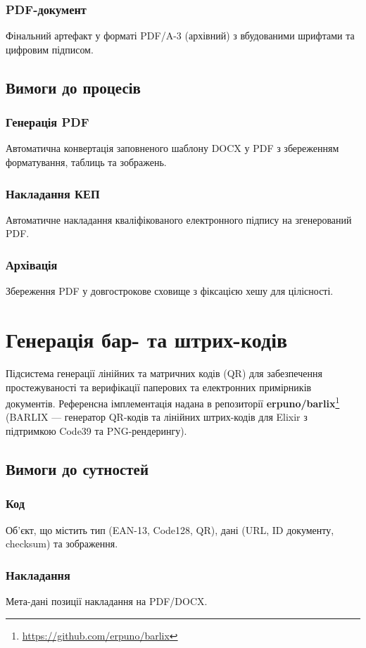 \documentclass{article}
\begin{document}
\subsubsection{PDF-документ}
Фінальний артефакт у форматі PDF/A-3 (архівний) з вбудованими шрифтами та цифровим підписом.

\subsection{Вимоги до процесів}
\subsubsection{Генерація PDF}
Автоматична конвертація заповненого шаблону DOCX у PDF з збереженням форматування, таблиць та зображень.

\subsubsection{Накладання КЕП}
Автоматичне накладання кваліфікованого електронного підпису на згенерований PDF.

\subsubsection{Архівація}
Збереження PDF у довгострокове сховище з фіксацією хешу для цілісності.

\newpage
\section{Генерація бар- та штрих-кодів}
Підсистема генерації лінійних та матричних кодів (QR) для забезпечення простежуваності та верифікації паперових та електронних примірників документів.
Референсна імплементація надана в репозиторії \textbf{erpuno/barlix}\footnote{\url{https://github.com/erpuno/barlix}}
(BARLIX — генератор QR-кодів та лінійних штрих-кодів для Elixir з підтримкою Code39 та PNG-рендерингу).

\subsection{Вимоги до сутностей}
\subsubsection{Код}
Об’єкт, що містить тип (EAN-13, Code128, QR), дані (URL, ID документу, checksum) та зображення.

\subsubsection{Накладання}
Мета-дані позиції накладання на PDF/DOCX.
\end{document}
